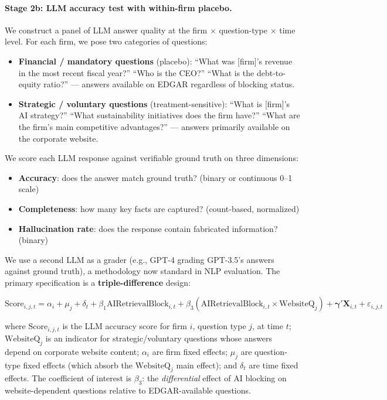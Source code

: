 \documentclass[12pt,a4paper]{article}
\begin{document}
\paragraph{Stage 2b: LLM accuracy test with within-firm placebo.} We construct a panel of LLM answer quality at the firm $\times$ question-type $\times$ time level. For each firm, we pose two categories of questions:

\begin{itemize}
    \item \textbf{Financial / mandatory questions} (placebo): ``What was [firm]'s revenue in the most recent fiscal year?'' ``Who is the CEO?'' ``What is the debt-to-equity ratio?'' --- answers available on EDGAR regardless of blocking status.
    \item \textbf{Strategic / voluntary questions} (treatment-sensitive): ``What is [firm]'s AI strategy?'' ``What sustainability initiatives does the firm have?'' ``What are the firm's main competitive advantages?'' --- answers primarily available on the corporate website.
\end{itemize}

\noindent We score each LLM response against verifiable ground truth on three dimensions:
\begin{itemize}
    \item \textbf{Accuracy}: does the answer match ground truth? (binary or continuous 0--1 scale)
    \item \textbf{Completeness}: how many key facts are captured? (count-based, normalized)
    \item \textbf{Hallucination rate}: does the response contain fabricated information? (binary)
\end{itemize}

\noindent We use a second LLM as a grader (e.g., GPT-4 grading GPT-3.5's answers against ground truth), a methodology now standard in NLP evaluation. The primary specification is a \textbf{triple-difference} design:

\begin{equation}
\text{Score}_{i,j,t} = \alpha_i + \mu_j + \delta_t + \beta_1 \text{AIRetrievalBlock}_{i,t} + \beta_3 (\text{AIRetrievalBlock}_{i,t} \times \text{WebsiteQ}_{j}) + \boldsymbol{\gamma}' \mathbf{X}_{i,t} + \varepsilon_{i,j,t}
\label{eq:triple_diff}
\end{equation}

\noindent where $\text{Score}_{i,j,t}$ is the LLM accuracy score for firm $i$, question type $j$, at time $t$; $\text{WebsiteQ}_{j}$ is an indicator for strategic/voluntary questions whose answers depend on corporate website content; $\alpha_i$ are firm fixed effects; $\mu_j$ are question-type fixed effects (which absorb the $\text{WebsiteQ}_{j}$ main effect); and $\delta_t$ are time fixed effects. The coefficient of interest is $\beta_3$: the \emph{differential} effect of AI blocking on website-dependent questions relative to EDGAR-available questions.
\end{document}
